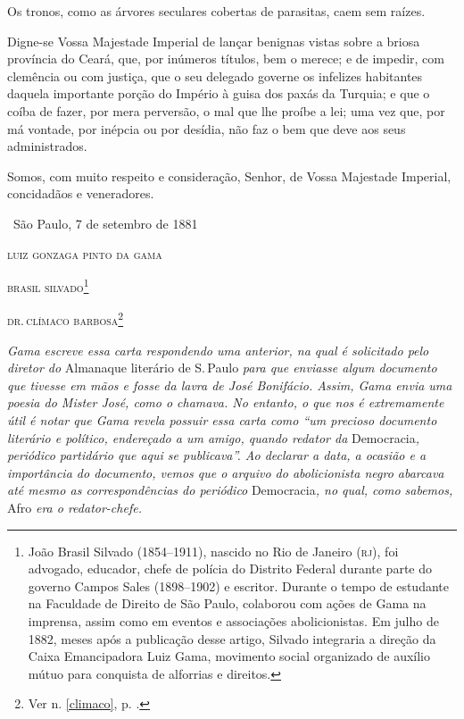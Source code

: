 {Os tronos, como as árvores seculares cobertas de parasitas, caem sem
raízes.

Digne-se Vossa Majestade Imperial de lançar benignas vistas sobre a
briosa província do Ceará, que, por inúmeros títulos, bem o merece; e de
impedir, com clemência ou com justiça, que o seu delegado governe os
infelizes habitantes daquela importante porção do Império à guisa dos
paxás da Turquia; e que o coíba de fazer, por mera perversão, o mal que
lhe proíbe a lei; uma vez que, por má vontade, por inépcia ou por
desídia, não faz o bem que deve aos seus administrados.

Somos, com muito respeito e consideração, Senhor, de Vossa Majestade
Imperial, concidadãos e veneradores.\medskip

\hfill\ São Paulo, 7 de setembro de 1881

\hfill\textsc{luiz gonzaga pinto da gama}

\hfill\textsc{brasil silvado}\footnote{João Brasil Silvado (1854--1911), nascido no
  Rio de Janeiro (\textsc{rj}), foi advogado, educador, chefe de polícia do
  Distrito Federal durante parte do governo Campos Sales (1898--1902) e
  escritor. Durante o tempo de estudante na Faculdade de Direito de São
  Paulo, colaborou com ações de Gama na imprensa, assim como em eventos
  e associações abolicionistas. Em julho de 1882, meses após a
  publicação desse artigo, Silvado integraria a direção da Caixa
  Emancipadora Luiz Gama, movimento social organizado de auxílio mútuo
  para conquista de alforrias e direitos.}

\hfill\textsc{dr.\,clímaco barbosa}\footnote{Ver n. \ref{climaco}, p. \pageref{climaco}.}


\begin{resumo}
\emph{Gama escreve essa carta respondendo uma anterior, na qual é
solicitado pelo diretor do} Almanaque literário de S.\,Paulo \emph{para
que enviasse algum documento que tivesse em mãos e fosse da lavra de
José Bonifácio. Assim, Gama envia uma poesia do Mister José, como o
chamava. No entanto, o que nos é extremamente útil é notar que Gama
revela possuir essa carta como ``um precioso documento literário e
político, endereçado a um amigo, quando redator da} Democracia\emph{,
periódico partidário que aqui se publicava''. Ao declarar a data, a
ocasião e a importância do documento, vemos que o arquivo do
abolicionista negro abarcava até mesmo as correspondências do periódico}
Democracia\emph{, no qual, como sabemos,} Afro \emph{era o
redator-chefe.}
\end{resumo}

}
